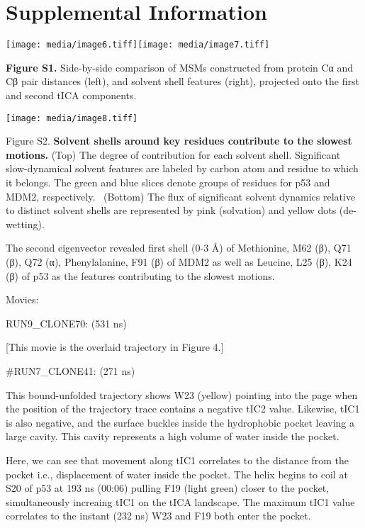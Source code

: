 

\section{Supplemental Information}

\texttt{[image: media/image6.tiff]}\texttt{[image: media/image7.tiff]}

\textbf{Figure S1.} Side-by-side comparison of MSMs constructed from
protein Cα and Cβ pair distances (left), and solvent shell features
(right), projected onto the first and second tICA components.

\texttt{[image: media/image8.tiff]}

Figure S2. \textbf{Solvent shells around key residues contribute to the
slowest motions.} (Top) The degree of contribution for each solvent
shell. Significant slow-dynamical solvent features are labeled by carbon
atom and residue to which it belongs. The green and blue slices denote
groups of residues for p53 and MDM2, respectively.~ (Bottom) The flux of
significant solvent dynamics relative to distinct solvent shells are
represented by pink (solvation) and yellow dots (de-wetting).

The second eigenvector revealed first shell (0-3 Å) of Methionine, M62
(β), Q71 (β), Q72 (α), Phenylalanine, F91 (β) of MDM2 as well as
Leucine, L25 (β), K24 (β) of p53 as the features contributing to the
slowest motions.

Movies:

RUN9\_CLONE70: (531 ns)

{[}This movie is the overlaid trajectory in Figure 4.{]}

\#RUN7\_CLONE41: (271 ns)

This bound-unfolded trajectory shows W23 (yellow) pointing into the page
when the position of the trajectory trace contains a negative tIC2
value. Likewise, tIC1 is also negative, and the surface buckles inside
the hydrophobic pocket leaving a large cavity. This cavity represents a
high volume of water inside the pocket.

Here, we can see that movement along tIC1 correlates to the distance
from the pocket i.e., displacement of water inside the pocket. The helix
begins to coil at S20 of p53 at 193 ns (00:06) pulling F19 (light green)
closer to the pocket, simultaneously increaing tIC1 on the tICA
landscape. The maximum tIC1 value correlates to the instant (232 ns) W23
and F19 both enter the pocket.

